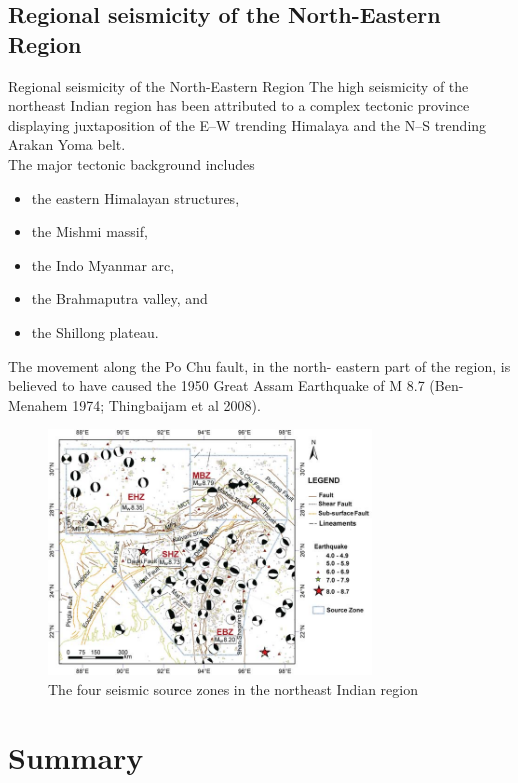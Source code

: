 \documentclass[smaller]{beamer}
\begin{document}
\subsection{Regional  seismicity of the North-Eastern Region}
\begin{frame}{Regional  seismicity of the North-Eastern Region}
The high seismicity of the northeast Indian region
has been attributed to a complex tectonic province
displaying juxtaposition of the E–W trending
Himalaya and the N–S trending Arakan Yoma
belt.\\
The major tectonic background includes 
\begin{itemize}
\item the
eastern Himalayan structures, 
\item the Mishmi massif,
\item the Indo Myanmar arc, 
\item the Brahmaputra valley,
and \item the Shillong plateau.
\end{itemize}
The movement along the Po Chu fault, in the north-
eastern part of the region, is believed to have
caused the 1950 Great Assam Earthquake of M
8.7 (Ben-Menahem 1974; Thingbaijam et al 2008).
\end{frame}
\begin{frame}
\begin{figure}
\includegraphics[height=6.5cm]{ne.png}
\caption{The four seismic source zones in the northeast Indian region}
\end{figure}
\end{frame}
\section*{Summary}
\end{document}
